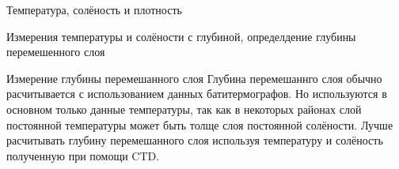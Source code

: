 \begin{chapter}{Температура, солёность и плотность}
\begin{section}{Измерения температуры и солёности с глубиной, определдение глубины перемешенного слоя}


\begin{paragraph}{Измерение глубины перемешанного слоя}
Глубина перемешаннго слоя обычно расчитывается с использованием данных
батитермографов. Но используются в основном только данные температуры,
так как в некоторых районах слой постоянной температуры может быть
толще слоя постоянной солёности. Лучше расчитывать глубину
перемешанного слоя используя температуру и солёность полученную при
помощи CTD.


\end{paragraph}
\end{section}
\end{chapter}
